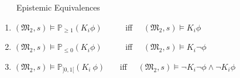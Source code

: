 \begin{theorem} \label{thm: Ki equivalence} \ \ \ \ {Epistemic Equivalences}

    \begin{enumerate}
        \item $(\mathfrak{M_2},s)\models \mathbb{P}_{\geq1}(K_i\phi)$  ~~~~~iff~~  $(\mathfrak{M_2},s) \models K_i\phi$
        \item $(\mathfrak{M_2},s)\models \mathbb{P}_{\leq 0}(K_i\phi)$   ~~~~~iff~~  $(\mathfrak{M_2},s)\models K_i \neg \phi$
        \item $(\mathfrak{M_2},s)\models \mathbb{P}_{]0,1[}(K_i~\phi)$  ~~~iff~~   $(\mathfrak{M_2},s)\models \neg K_i\neg\phi \wedge \neg K_i\phi$

    \end{enumerate}

\end{theorem}


